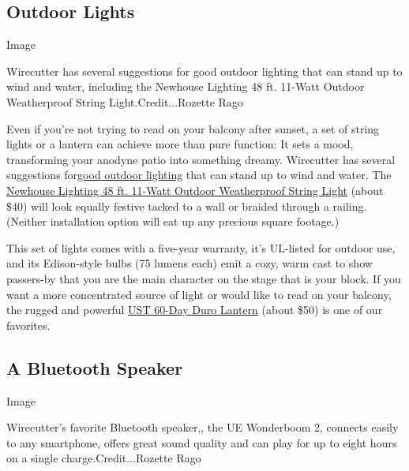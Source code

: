 \hypertarget{outdoor-lights}{%
\subsection{Outdoor Lights}\label{outdoor-lights}}

Image

Wirecutter has several suggestions for good outdoor lighting that can
stand up to wind and water, including the Newhouse Lighting 48 ft.
11-Watt Outdoor Weatherproof String Light.Credit...Rozette Rago

Even if you're not trying to read on your balcony after sunset, a set of
string lights or a lantern can achieve more than pure function: It sets
a mood, transforming your anodyne patio into something dreamy.
Wirecutter has several suggestions
for\href{https://www.nytimes3xbfgragh.onion/wirecutter/reviews/best-led-lantern/?utm_source=nytimes\&utm_medium=referral\&utm_campaign=outdoor-space}{good
outdoor lighting} that can stand up to wind and water. The
\href{https://www.nytimes3xbfgragh.onion/wirecutter/reviews/best-led-lantern/?utm_source=nytimes\&utm_medium=referral\&utm_campaign=outdoor-space\#string-light-newhouse-lighting-48-ft-11-watt-outdoor-weatherproof-string-light}{Newhouse
Lighting 48 ft. 11-Watt Outdoor Weatherproof String Light} (about \$40)
will look equally festive tacked to a wall or braided through a railing.
(Neither installation option will eat up any precious square footage.)

This set of lights comes with a five-year warranty, it's UL-listed for
outdoor use, and its Edison-style bulbs (75 lumens each) emit a cozy,
warm cast to show passers-by that you are the main character on the
stage that is your block. If you want a more concentrated source of
light or would like to read on your balcony, the rugged and powerful
\href{https://www.nytimes3xbfgragh.onion/wirecutter/reviews/best-led-lantern/?utm_source=nytimes\&utm_medium=referral\&utm_campaign=outdoor-space\#tabletop-lantern-ust-60-day-duro-lantern}{UST
60-Day Duro Lantern} (about \$50) is one of our favorites.

\hypertarget{a-bluetooth-speaker}{%
\subsection{A Bluetooth Speaker}\label{a-bluetooth-speaker}}

Image

Wirecutter's favorite Bluetooth speaker,, the UE Wonderboom 2, connects
easily to any smartphone, offers great sound quality and can play for up
to eight hours on a single charge.Credit...Rozette Rago

